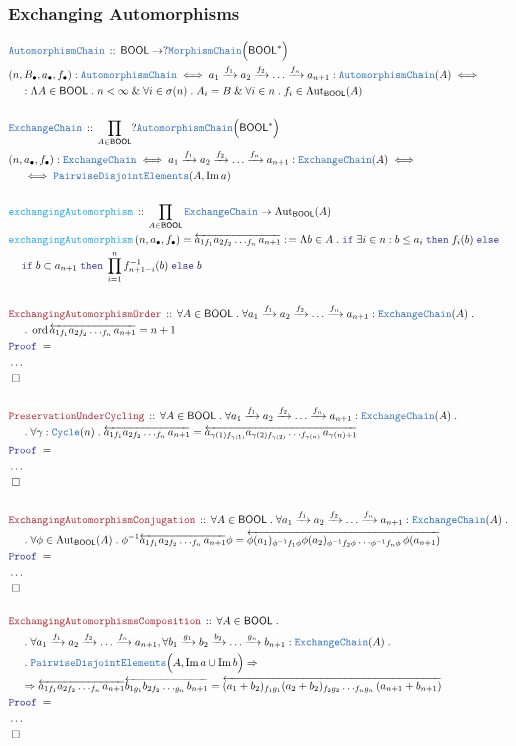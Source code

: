 \documentclass[12pt]{scrartcl}
\newcommand{\TYPE}[1]{\textcolor{NavyBlue}{\mathtt{#1}}}
\newcommand{\FUNC}[1]{\textcolor{Cerulean}{\mathtt{#1}}}
\newcommand{\LOGIC}[1]{\textcolor{Blue}{\mathtt{#1}}}
\newcommand{\THM}[1]{\textcolor{Maroon}{\mathtt{#1}}}
\renewcommand{\.}{\; . \;}
\newcommand{\de}{: \kern 0.1pc =}
\newcommand{\If}{\LOGIC{if} \;}
\newcommand{\Then}{ \; \LOGIC{then} \;}
\newcommand{\Else}{\; \LOGIC{else} \;}
\newcommand{\Act}[1]{\left( #1 \right)}
\newcommand{\Theorem}[2]{& \THM{#1} \, :: \, #2 \\ & \Proof = \\ }
\newcommand{\DeclareType}[2]{& \TYPE{#1} \, :: \, #2 \\}
\newcommand{\DefineNamedType}[4]{& #1 : \TYPE{#2} \iff #3 \iff #4 \\}
\newcommand{\DeclareFunc}[2]{& \FUNC{#1} \, :: \, #2 \\}
\newcommand{\DefineNamedFunc}[4]{&  \FUNC{#1}\Act{#2} = #3 \de #4 \\}
\newcommand{\NewLine}{\\ & \kern 1pc}
\newcommand{\Page}[1]{ \begin{align*} #1 \end{align*}   }
\newcommand{\NoProof}{ & \ldots \\ \EndProof}
\renewcommand{\And}{\; \& \;}
\newcommand{\Imply}{\Rightarrow}
\DeclareMathOperator*{\im}{Im}
\newcommand{\Aut}{\mathrm{Aut}}
\newcommand{\Arrow}{\xrightarrow}
\newcommand{\QED}{\; \square}
\newcommand{\EndProof}{& \QED \\}
\newcommand{\Proof}{\LOGIC{Proof} \; }
\DeclareMathOperator{\ord}{ord}
\newcommand{\PD}{\TYPE{PairwiseDisjointElements}}
\newcommand{\BOOL}{\mathsf{BOOL}}
\begin{document}
\subsubsection{Exchanging Automorphisms}
\Page{
	\DeclareType{AutomorphismChain}
	{
		\BOOL \to  ? \TYPE{MorphismChain}\Big(\BOOL^*\Big)
	}
	\DefineNamedType{(n,B_\bullet,a_\bullet,f_\bullet)}{AutomorphismChain}
	{
		a_1 \Arrow{f_1} a_2 \Arrow{f_2} \ldots \Arrow{f_{n}} a_{n+1} : 
		\TYPE{AutomorphismChain}(A)
	}
	{
		\NewLine :		
		\Lambda A \in \BOOL \.		
		n < \infty  \And
		\forall i \in \sigma(n) \.  A_i = B \And
		\forall i \in n \.  f_i \in \Aut_\BOOL(A)    	
	}
	\\
	\DeclareType{ExchangeChain}
	{
		\prod_{A \in \BOOL} ?\TYPE{AutomorphismChain}\Big(\BOOL^*\Big)
	}
	\DefineNamedType{(n,a_\bullet,f_\bullet)}{ExchangeChain}
	{
		a_1 \Arrow{f_1} a_2 \Arrow{f_2} \ldots \Arrow{f_{n}} a_{n+1} : 
		\TYPE{ExchangeChain}(A)
	}
	{
		\NewLine \iff
		\PD(A,\im a)  	
	}
	\\
	\DeclareFunc{exchangingAutomorphism}
	{
		\prod_{A \in \BOOL} 
		\TYPE{ExchangeChain} 
		\to
		\Aut_\BOOL(A) 
	}
	\DefineNamedFunc{exchangingAutomorphism}
	{
		n, a_\bullet, f_\bullet
	}
	{
		\overleftarrow{a_{1 f_1} a_{2f_2} \ldots_{f_n}a_{n+1}}
	}
	{
		\Lambda b \in A \.
		\If \exists i \in n : b \le a_i \Then f_i(b) \Else \NewLine
		\If b \subset a_{n+1} \Then  \prod^n_{i=1} f^{-1}_{n+1-i}(b) 
		\Else b
	}
	\\
	\Theorem{ExchangingAutomorphismOrder}
	{
		\forall A \in \BOOL \.
		\forall a_1 \Arrow{f_1} a_2 \Arrow{f_2} \ldots \Arrow{f_{n}} a_{n+1} : 
		\TYPE{ExchangeChain}(A) \. \NewLine \.
		\ord \overleftarrow{a_{1 f_1} a_{2f_2} \ldots_{f_n}a_{n+1}} = n + 1
	}
	\NoProof
	\\
	\Theorem{PreservationUnderCycling}
	{
		\forall A \in \BOOL \.
		\forall a_1 \Arrow{f_1} a_2 \Arrow{f_2} \ldots \Arrow{f_{n}} a_{n+1} : 
		\TYPE{ExchangeChain}(A) \. \NewLine \.
		\forall \gamma : \TYPE{Cycle}(n) \.
		\overleftarrow{a_{1 f_1} a_{2f_2} \ldots_{f_n}a_{n+1}} =
		\overleftarrow{a_{\gamma(1) f_{\gamma(1)}} a_{\gamma(2)f_{\gamma(2)}}
		 \ldots_{f_{\gamma(n)}}a_{\gamma(n) + 1}}
	}
	\NoProof
	\\
	\Theorem{ExchangingAutomorphismConjugation}
	{
		\forall A \in \BOOL \.
		\forall a_1 \Arrow{f_1} a_2 \Arrow{f_2} \ldots \Arrow{f_{n}} a_{n+1} : 
		\TYPE{ExchangeChain}(A) \. \NewLine \.
		\forall \phi \in \Aut_\BOOL(A) \.
		\phi^{-1}\overleftarrow{a_{1 f_1} a_{2f_2} \ldots_{f_n}a_{n+1}} \phi=
		\overleftarrow{\phi(a_{1})_{ \phi^{-1} f_1 \phi} 
		\phi(a_2)_{\phi^{-1}f_2\phi}
		 \ldots_{\phi^{-1}f_{n}\phi}\phi(a_{n + 1})}
	}
	\NoProof
	\\
	\Theorem{ExchangingAutomorphismsComposition}
	{
		\forall A \in \BOOL \. \NewLine \.
		\forall a_1 \Arrow{f_1} a_2 \Arrow{f_2} \ldots \Arrow{f_{n}} a_{n+1}, 
		\forall b_1 \Arrow{g_1} b_2 \Arrow{b_2} \ldots \Arrow{g_{n}} b_{n+1} :
		\TYPE{ExchangeChain}(A) \. \NewLine \.
		\PD\Big( A, \im a \cup \im b\Big) \Imply \NewLine \Imply
		\overleftarrow{a_{1 f_1} a_{2f_2} \ldots_{f_n}a_{n+1}}
		\overleftarrow{b_{1 g_1} b_{2f_2} \ldots_{g_n}b_{n+1}} =
		\overleftarrow{(a_1 + b_2)_{f_1g_1} (a_2 + b_2)_{f_2g_2} 
		\ldots_{f_ng_n}(a_{n+1} + b_{n+1})}
	}
	\NoProof
}
\end{document}
